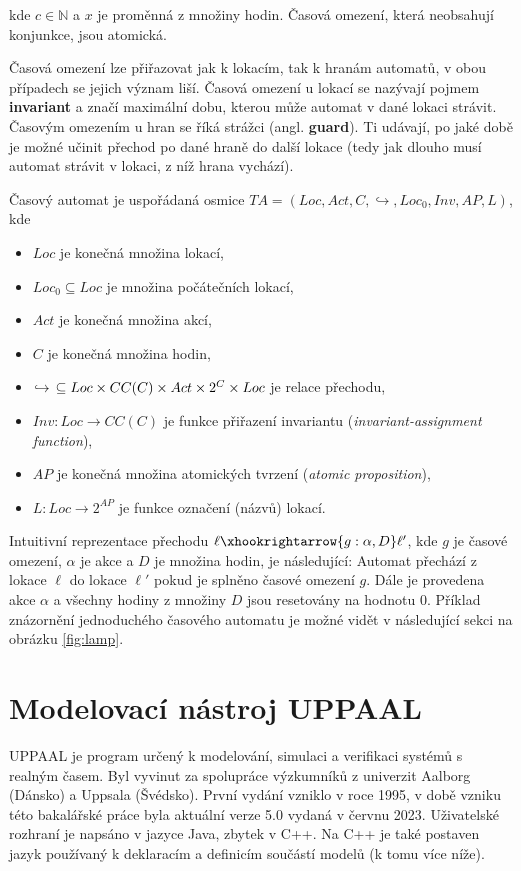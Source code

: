 kde $c \in \mathbb{N}$ a $x$ je proměnná z množiny hodin. Časová omezení, která neobsahují konjunkce, jsou atomická.

Časová omezení lze přiřazovat jak k lokacím, tak k hranám automatů, v obou případech se jejich význam liší. Časová omezení u lokací se nazývají pojmem \textbf{invariant} a značí maximální dobu, kterou může automat v dané lokaci strávit. Časovým omezením u hran se říká strážci (angl. \textbf{guard}). Ti udávají, po jaké době je možné učinit přechod po dané hraně do další lokace (tedy jak dlouho musí automat strávit v lokaci, z níž hrana vychází).

\bigskip

Časový automat je uspořádaná osmice $TA = (Loc, Act, C, \hookrightarrow, Loc_0, Inv, AP, L)$, kde

\begin{itemize}
    \item $Loc$ je konečná množina lokací,
    \item $Loc_0 \subseteq Loc$ je množina počátečních lokací,
    \item $Act$ je konečná množina akcí,
    \item $C$ je konečná množina hodin,
    \item $\hookrightarrow \hspace{0.15cm} \subseteq Loc \times CC(C) \times Act \times 2^C \times Loc$ je relace přechodu,
    \item $Inv: Loc \rightarrow CC(C)$ je funkce přiřazení invariantu (\textit{invariant-assignment function}),
    \item $AP$ je konečná množina atomických tvrzení (\textit{atomic proposition}),
    \item $L: Loc \rightarrow 2^{AP}$ je funkce označení (názvů) lokací.
\end{itemize}

Intuitivní reprezentace přechodu $\ell \xhookrightarrow{g:\alpha,D} \ell'$, kde $g$ je časové omezení, $\alpha$ je akce a $D$ je množina hodin, je následující: Automat přechází z lokace $\ell$ do lokace $\ell'$ pokud je splněno časové omezení $g$. Dále je provedena akce $\alpha$ a všechny hodiny z množiny $D$ jsou resetovány na hodnotu 0. Příklad znázornění jednoduchého časového automatu je možné vidět v následující sekci na obrázku \ref{fig:lamp}.

\section{Modelovací nástroj UPPAAL} \label{uppaal}
UPPAAL je program určený k modelování, simulaci a verifikaci systémů s realným časem. Byl vyvinut za spolupráce výzkumníků z univerzit Aalborg (Dánsko) a Uppsala (Švédsko). První vydání vzniklo v roce 1995, v době vzniku této bakalářské práce byla aktuální verze 5.0 vydaná v červnu 2023. Uživatelské rozhraní je napsáno v jazyce Java, zbytek v C++. Na C++ je také postaven jazyk používaný k deklaracím a definicím součástí modelů (k tomu více níže).

